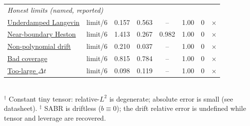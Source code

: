 \begin{table}[t]
\begin{tabular}{l l c c c c c c}
\midrule
\multicolumn{8}{l}{\textit{Honest limits (named, reported)}}\\
\hyperref[sec:v62-underdamped-langevin]{Underdamped Langevin} & limit/6 & 0.157 & 0.563 & -- & 1.00 & 0 & $\times$ \\
\hyperref[sec:v62-near-boundary-heston]{Near-boundary Heston} & limit/6 & 1.413 & 0.267 & 0.982 & 1.00 & 0 & $\times$ \\
\hyperref[sec:v62-nonpoly-drift]{Non-polynomial drift} & limit/6 & 0.210 & 0.037 & -- & 1.00 & 0 & $\times$ \\
\hyperref[sec:v62-bad-coverage]{Bad coverage} & limit/6 & 0.815 & 0.784 & -- & 1.00 & 0 & $\times$ \\
\hyperref[sec:v62-too-large-dt]{Too-large $\Delta t$} & limit/6 & 0.098 & 0.119 & -- & 1.00 & 0 & $\times$ \\
\bottomrule
\end{tabular}
\\[2pt]
\footnotesize $^\dagger$ Constant tiny tensor: relative-$L^2$ is degenerate; absolute error is small (see datasheet).
$^\ddagger$ SABR is driftless ($b\equiv0$); the drift relative error is undefined while tensor and leverage are recovered.
\end{table}
